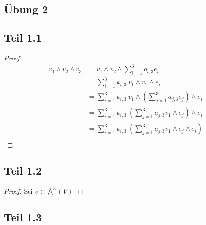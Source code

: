 \documentclass[10pt,a4paper]{article}
\begin{document}
\subsection*{Übung 2}

\subsection*{Teil 1.1}

\begin{proof}
\begin{align*}
v_{1} \wedge v_{2} \wedge v_{3} & = v_{1} \wedge v_{2} \wedge \sum_{i = 1}^{3} a_{i, 3} e_{i}\\
& = \sum_{i = 1}^{3} a_{i, 3}\ v_{1} \wedge v_{2} \wedge e_{i}\\
& = \sum_{i = 1}^{3} a_{i, 3}\ v_{1} \wedge \left( \sum_{j = 1}^{3} a_{j, 3} e_{j} \right) \wedge e_{i}\\
& = \sum_{i = 1}^{3} a_{i, 3}\ \left( \sum_{j = 1}^{3} a_{j, 3} v_{1} \wedge e_{j} \right) \wedge e_{i}\\
& = \sum_{i = 1}^{3} a_{i, 3}\ \left( \sum_{j = 1}^{3} a_{j, 3} v_{1} \wedge e_{j}  \wedge e_{i}\right)\\
\end{align*}
\end{proof}

\subsection*{Teil 1.2}

\begin{proof}
Sei $v \in \bigwedge^{3}(V)$.
\end{proof}

\subsection*{Teil 1.3}
\end{document}
